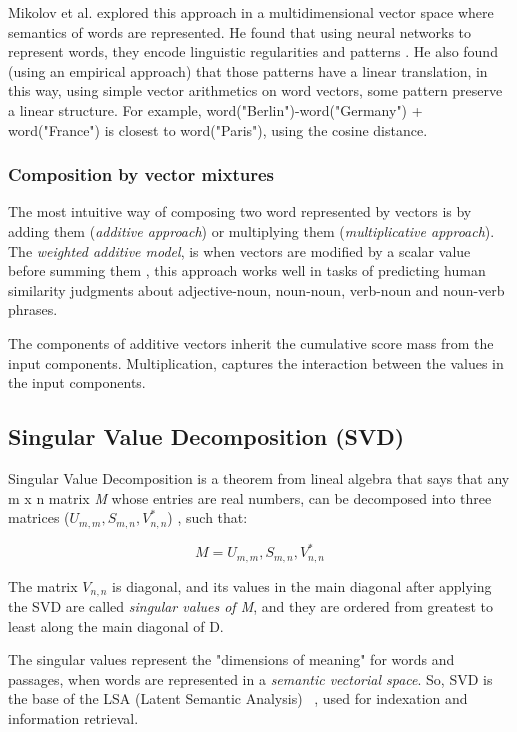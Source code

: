 Mikolov et al. explored this approach in a multidimensional vector space where semantics of words are represented. He found that using neural networks to represent words, they encode linguistic regularities and patterns \cite{compositionality2013Mikolov}. He also found (using an empirical approach) that those patterns have a linear translation, in this way, using simple vector arithmetics on word vectors, some pattern preserve a linear structure. For example, word("Berlin")-word("Germany") + word("France") is closest to word("Paris"), using the cosine distance. 

\subsubsection{Composition by vector mixtures}
The most intuitive way of composing two word represented by vectors is by adding them (\textit{additive approach}) or multiplying them (\textit{multiplicative approach}).  The \textit{weighted additive model}, is when vectors are modified by a scalar value before summing them \cite{mitchell2010composition}, this approach works well in tasks of predicting human similarity judgments about adjective-noun, noun-noun, verb-noun and noun-verb phrases.

The components of additive vectors inherit the cumulative score mass from the input components. Multiplication, captures the interaction between the values in the input components. 
   

%
\subsection{Singular Value Decomposition (SVD)}
%
Singular Value Decomposition is a theorem from lineal algebra that says  that any m x n matrix  \textit{M} whose entries are real numbers, can be decomposed into three matrices (\textit{$U_{m,m}, S_{m,n}, V_{n,n}^{*}$}) , such that: 

\begin{center}
\begin{equation}
\label{SVD}
M  = U_{m,m}, S_{m,n}, V_{n,n}^{*}
\end{equation}
\end{center}

The matrix \textit{$V_{n,n}$} is diagonal, and its values in the main diagonal after applying the SVD are called \textit{singular values of M}, and they are ordered from greatest to least along the main diagonal of D. 

The singular values represent the "dimensions of meaning" for words and passages, when words are represented in a \textit{semantic vectorial space}. So, SVD is the base of the LSA (Latent Semantic Analysis) ~\cite{landauer1998introduction}, used for indexation and information retrieval. 

